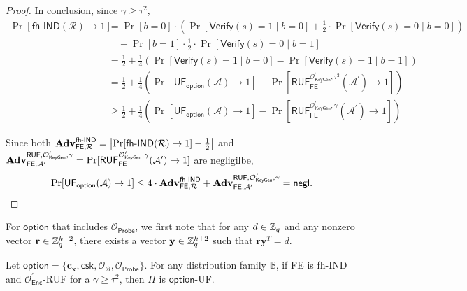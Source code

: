 \begin{proof}
In conclusion, since $\gamma \geq \tau^2$,
\begin{align*}
	\Pr[\textsf{fh-IND}(\mathcal{R}) \to 1] 
	&= \Pr[b = 0] \cdot \left( \Pr[\textsf{Verify}(s) = 1 \mid b = 0] + \frac{1}{2} \cdot \Pr[\textsf{Verify}(s) = 0 \mid b = 0] \right) \\
	&\quad + \Pr[b = 1] \cdot \frac{1}{2} \cdot \Pr[\textsf{Verify}(s) = 0 \mid b = 1] \\
	&= \frac{1}{2} + \frac{1}{4} \left( \Pr[\textsf{Verify}(s) = 1 \mid b = 0] - \Pr[\textsf{Verify}(s) = 1 \mid b = 1] \right) \\
	&= \frac{1}{2} + \frac{1}{4} \left( \Pr[\textsf{UF}_{\textsf{option}}(\mathcal{A}) \to 1] - \Pr[\textsf{RUF}^{\mathcal{O}^\prime_{\textsf{KeyGen}}, \tau^2}_{\textsf{FE}}(\mathcal{A}^\prime) \to 1 ] \right) \\
	&\geq \frac{1}{2} + \frac{1}{4} \left( \Pr[\textsf{UF}_\textsf{option}(\mathcal{A}) \to 1] - \Pr[\textsf{RUF}^{\mathcal{O}^\prime_{\textsf{KeyGen}}, \gamma}_{\textsf{FE}}(\mathcal{A}^\prime) \to 1 ] \right)
\end{align*}

\noindent Since both $\mathbf{Adv}_{\textsf{FE}, \mathcal{R}}^\textsf{fh-IND} = \left| \Pr[\textsf{fh-IND}(\mathcal{R}) \to 1] - \frac{1}{2} \right|$ and $\mathbf{Adv}_{\textsf{FE}, \mathcal{A}^\prime}^{\textsf{RUF},\mathcal{O}^\prime_{\textsf{KeyGen}}, \gamma} = \Pr[\textsf{RUF}^{\mathcal{O}^\prime_{\textsf{KeyGen}}, \gamma}_{\textsf{FE}}(\mathcal{A}^\prime) \to 1 ]$ are negligilbe,
\[
	\Pr[\textsf{UF}_\textsf{option}(\mathcal{A}) \to 1] \leq 4 \cdot \mathbf{Adv}_{\textsf{FE}, \mathcal{R}}^\textsf{fh-IND} + \mathbf{Adv}_{\textsf{FE}, \mathcal{A}^\prime}^{\textsf{RUF},\mathcal{O}^\prime_{\textsf{KeyGen}}, \gamma} = \mathsf{negl}.
\]

\end{proof}


For $\textsf{option}$ that includes $\mathcal{O}_{\textsf{Probe}}$, we first note that for any $d \in \mathbb{Z}_q$ and any nonzero vector $\mathbf{r} \in \mathbb{Z}_q^{k+2}$, there exists a vector $\mathbf{y} \in \mathbb{Z}_q^{k+2}$ such that $\mathbf{r}\mathbf{y}^T = d$.

\begin{theorem}
\label{thm:fh-IPFE:ind-uf-OB-Probe}
	Let $\textsf{option} = \{\mathbf{c_x}, \textsf{csk}, \mathcal{O}_\mathcal{B}, \mathcal{O}_\textsf{Probe}\}$. For any distribution family $\mathbb{B}$, if \textsf{FE} is fh-IND and $\mathcal{O}^\prime_{\textsf{Enc}}$-RUF for a $\gamma \geq \tau^2$, then $\Pi$ is $\textsf{option}$-UF. 
\end{theorem}


